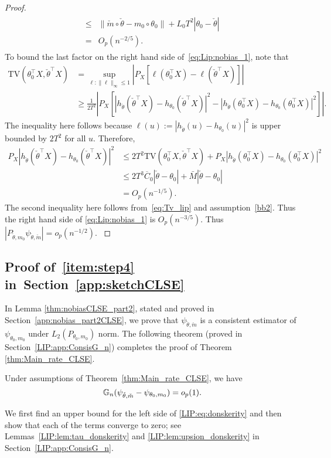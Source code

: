{\begin{proof}
\begin{align}
\begin{split}
\le{}&\|\check{m}\circ\check{\theta} - m_0 \circ\theta_0 \| + L_0 T^2 |\theta_0- \check{\theta}| \\
={}& O_p(n^{-2/5}).
\end{split}
\end{align}
{ To bound the last factor on the right hand side of~\eqref{eq:Lip:nobias_1}, note that
\begin{align*}
\mathrm{TV}(\theta_0^{\top}X, \check{\theta}^{\top}X) &= \sup_{\ell:\|\ell\|_{\infty} \le 1}\left|P_X[\ell(\theta_0^{\top}X) - \ell(\check{\theta}^{\top}X)]\right|\\ 
&\ge \frac{1}{2T^2}\left|P_X\left[|h_{\check{\theta}}(\check{\theta}^\top X)-h_{\theta_0}(\check{\theta}^\top X)|^2 - |h_{\check{\theta}}(\theta_0^\top X)-h_{\theta_0}(\theta_0^\top X)|^2\right]\right|.
\end{align*}
The inequality here follows because $\ell(u) := |h_{\check{\theta}}(u)-h_{\theta_0}(u)|^2$ is upper bounded by $2T^2$ for all $u$. Therefore,
\begin{align*}
P_X|h_{\check{\theta}}(\check{\theta}^\top X)-h_{\theta_0}(\check{\theta}^\top X)|^2 &\le 2T^2\mathrm{TV}(\theta_0^{\top}X, \check{\theta}^{\top}X) + P_X|h_{\check{\theta}}(\theta_0^\top X)-h_{\theta_0}(\theta_0^\top X)|^2\\
&\le 2T^3\overline{C}_0|\check{\theta} - \theta_0| + \bar{M}|\check{\theta} - \theta_0|\\
&= O_p(n^{-1/5}).
\end{align*}
The second inequality here follows from~\eqref{eq:Tv_lip} and assumption~\ref{bb2}. Thus the right hand side of \eqref{eq:Lip:nobias_1} is $O_p(n^{-3/5})$. Thus $|P_{\check{\theta}, m_0} \psi_{\check{\theta},\check{m}}| =o_p(n^{-1/2}).$ \qedhere}
\end{proof}


\subsection{Proof of~\ref{item:step4} in~Section~\ref{app:sketchCLSE}} %
\label{sub:proof_of_item:step4}

In Lemma \ref{thm:nobiasCLSE_part2}, stated and proved in Section~\ref{app:nobias_part2CLSE}, we prove that $\psi_{\check{\theta},\check{m}}$ is a consistent estimator of $\psi_{\theta_0,m_0}$ under $L_2(P_{\theta_0,m_0})$ norm. The following theorem (proved in Section~\ref{LIP:app:ConsisG_n}) completes the proof of Theorem \ref{thm:Main_rate_CLSE}.
\begin{thm}[\ref{item:step4}] \label{LIP:thm:ConsistencyofG_n}
Under assumptions of Theorem~\ref{thm:Main_rate_CLSE}, we have
\begin{equation}\label{LIP:eq:donskerity}
\mathbb{G}_n (\psi_{\check{\theta},\check{m}} -\psi_{\theta_0,m_0})=o_p(1).
 \end{equation}
\end{thm}
We first find an upper bound for the left side of \eqref{LIP:eq:donskerity} and then show that each of the terms converge to zero; see Lemmas~\ref{LIP:lem:tau_donskerity}  and \ref{LIP:lem:upsion_donskerity} in Section~\ref{LIP:app:ConsisG_n}.

}
